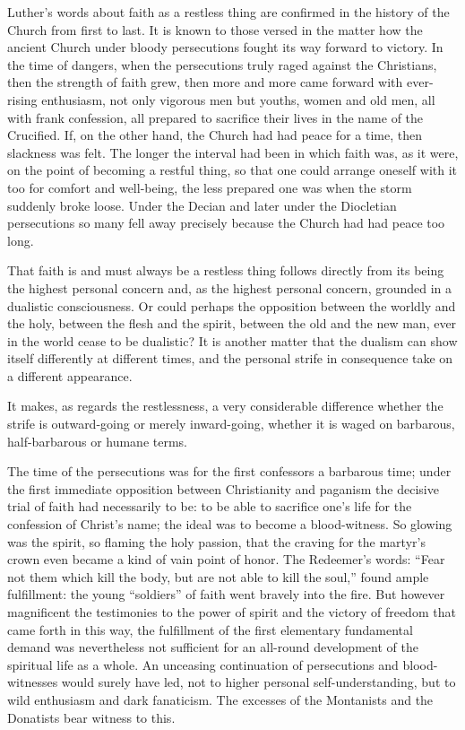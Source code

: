 \documentclass[12pt]{book}
\newcommand{\opage}[1]{\marginnote{\footnotesize\textit{[#1]}}}
\begin{document}
Luther's words about faith as a restless thing are confirmed in the history of
the Church from first to last. It is known to those versed in the matter how
the ancient Church under bloody persecutions fought its way forward to
victory. In the time of dangers, when the persecutions truly raged against the
Christians, then the strength of faith grew, then more and more came forward
with ever-rising enthusiasm, not only vigorous men but youths, women and old
men, all with frank confession, all prepared to sacrifice their lives in the
name of the Crucified. If, on the other hand, the Church had had peace for a
time, then slackness was felt. The longer the interval had been in which
faith was, as it were, on the point of becoming a restful thing, so that one
could arrange oneself with it too for comfort and well-being, the less
prepared one was when the storm suddenly broke loose. Under the Decian and
later under the Diocletian persecutions so many fell away precisely because
the Church had had peace too long.

That faith is and must always be a restless thing follows directly from its
being the highest personal concern and, as the highest personal concern,
grounded in a dualistic consciousness. Or could perhaps the opposition between
the worldly and the holy, between the flesh and the spirit, between the old
and the new man, ever in the world cease to be dualistic? It is
\opage{258}\setcounter{footnote}{0}%
another matter that the dualism can show itself differently at different
times, and the personal strife in consequence take on a different appearance.

It makes, as regards the restlessness, a very considerable difference whether
the strife is outward-going or merely inward-going, whether it is waged on
barbarous, half-barbarous or humane terms.

The time of the persecutions was for the first confessors a barbarous time;
under the first immediate opposition between Christianity and paganism the
decisive trial of faith had necessarily to be: to be able to sacrifice one's
life for the confession of Christ's name; the ideal was to become a
blood-witness. So glowing was the spirit, so flaming the holy passion, that
the craving for the martyr's crown even became a kind of vain point of honor.
The Redeemer's words: ``Fear not them which kill the body, but are not able to
kill the soul,'' found ample fulfillment: the young ``soldiers'' of faith went
bravely into the fire. But however magnificent the testimonies to the power of
spirit and the victory of freedom that came forth in this way, the fulfillment
of the first elementary fundamental demand was nevertheless not sufficient for
an all-round development of the spiritual life as a whole. An unceasing
continuation of persecutions and blood-witnesses would surely have led, not to
higher personal self-understanding, but to wild enthusiasm and dark
fanaticism. The excesses of the Montanists and the Donatists bear witness to
this.
\end{document}
